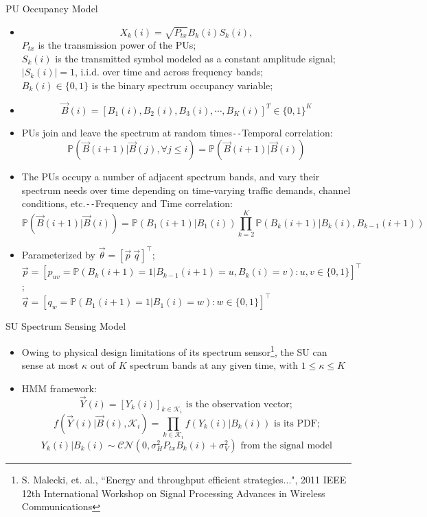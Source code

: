 \documentclass{beamer}
\begin{document}
\begin{frame}{PU Occupancy Model}
    \scriptsize{\begin{itemize}
        \item \[X_k(i) = \sqrt{P_{tx}}B_k(i)S_k(i),\]
        $P_{tx}$ is the transmission power of the PUs;
        \\$S_k(i)$ is the transmitted symbol modeled as a constant amplitude signal;
        \\$|S_k(i)|{=}1$, i.i.d. over time and across frequency bands;
        \\$B_k(i){\in}\{0,1\}$ is the binary spectrum occupancy variable;
        \item \[\vec{B}(i) = [B_1(i), B_2(i), B_3(i), \cdots, B_K(i)]^T {\in} \{0, 1\}^K\]
        \item PUs join and leave the spectrum at random times\texttt{-{}-}Temporal correlation: 
        \[\mathbb{P}(\vec{B}(i+1)|\vec{B}(j), \forall j \leq i) = \mathbb{P}(\vec{B}(i+1)|\vec{B}(i))\]
        \item The PUs occupy a number of adjacent spectrum bands, and vary their spectrum needs over time depending on time-varying traffic demands, channel conditions, etc.\texttt{-{}-}Frequency and Time correlation:
        \[\mathbb{P}(\vec{B}(i+1)|\vec{B}(i))=\mathbb{P}(B_{1}(i+1)|B_{1}(i))\prod_{k=2}^{K}\mathbb{P}(B_{k}(i+1)|B_{k}(i), B_{k-1}(i+1))\]
        \item Parameterized by $\vec{\theta}{=}[\vec{p}\ \vec{q}]^\intercal$; \\$\vec{p}{=}[p_{uv}{=}\mathbb{P}(B_{k}(i{+}1){=}1|B_{k{-}1}(i{+}1){=}u,B_{k}(i){=}v){:} u,v{\in}\{0,1\}]^{\intercal}$; \\$\vec{q}{=}[q_{w}{=}\mathbb{P}(B_{1}(i{+}1){=}1|B_{1}(i){=}w){:}w{\in}\{0,1\}]^\intercal$
    \end{itemize}}
\end{frame}
\begin{frame}{SU Spectrum Sensing Model}
    \begin{itemize}
        \item Owing to physical design limitations of its spectrum sensor\footnote{\tiny{S. Malecki, et. al., ``Energy and throughput efficient strategies...", 2011 IEEE 12th International Workshop on Signal Processing Advances in Wireless Communications}}, the SU can sense at most $\kappa$ out of $K$ spectrum bands at any given time, with $1{\leq}\kappa{\leq}K$
        \item HMM framework:
        \[\vec{Y}(i) = [Y_k(i)]_{k {\in} \mathcal K_i}\text{ is the observation vector};\]
        \[f(\vec{Y}(i)|\vec{B}(i), \mathcal K_i) = \prod_{k \in \mathcal K_i} f(Y_k(i)|B_k(i))\text{ is its PDF;}\]
        \[Y_k(i)|B_k(i) \sim \mathcal{CN}(0, \sigma_H^2P_{tx}B_k(i) + \sigma_V^2)\text{ from the signal model}\]
    \end{itemize}
\end{frame}
\end{document}
